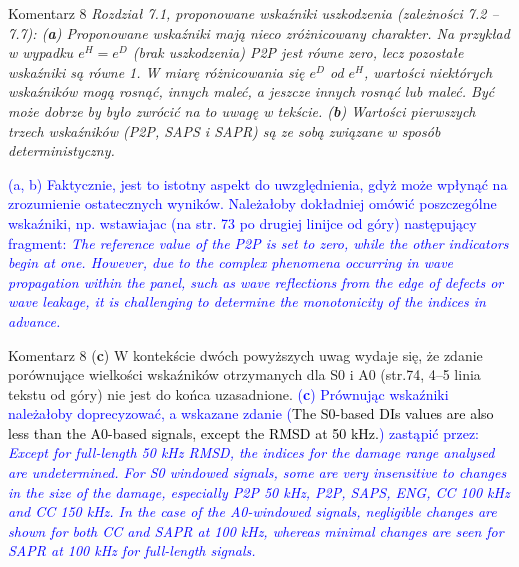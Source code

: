 \documentclass[10pt,aspectratio=169]{beamer} %
\begin{document}
\begin{frame}[label=frame13]{Komentarz 8}\justifying
\textit{Rozdział 7.1, proponowane wskaźniki uszkodzenia (zależności 7.2 – 7.7):
(\textbf{a}) Proponowane wskaźniki mają nieco zróżnicowany charakter. Na przykład w wypadku	\(e^H = e^D\) (brak uszkodzenia) P2P jest równe zero, lecz pozostałe wskaźniki są równe 1. W miarę różnicowania się \(e^D\) od \(e^H\), wartości niektórych wskaźników mogą rosnąć, innych maleć, a jeszcze innych rosnąć lub maleć. Być może dobrze by było zwrócić na to uwagę w tekście. (\textbf{b}) Wartości pierwszych trzech wskaźników (P2P, SAPS i SAPR) są ze sobą związane w sposób deterministyczny.\\}

\textcolor{blue}{(a, b) Faktycznie, jest to istotny aspekt do uwzględnienia, gdyż może wpłynąć na zrozumienie ostatecznych wyników. Należałoby dokładniej omówić poszczególne wskaźniki, np. wstawiajac (na str. 73 po drugiej linijce od góry) następujący fragment: \textit{The reference value of the P2P is set to zero, while the other indicators begin at one. However, due to the complex phenomena occurring in wave propagation within the panel, such as wave reflections from the edge of defects or wave leakage, it is challenging to determine the monotonicity of the indices in advance.}}
\end{frame}
\begin{frame}[label=frame14]{Komentarz 8}\justifying 
(\textbf{c}) W kontekście dwóch powyższych uwag wydaje się, że zdanie porównujące wielkości wskaźników otrzymanych dla S0 i A0 (str.74, 4–5 linia tekstu od góry) nie jest do końca uzasadnione.
\textcolor{blue}{(\textbf{c}) Prównując wskaźniki należałoby doprecyzować, a wskazane zdanie (\textcolor{black}{The S0-based DIs values are also less than the A0-based signals,	except the RMSD at 50 kHz.}) zastąpić przez: \textit{Except for full-length 50 kHz RMSD, the indices for the damage range analysed are undetermined. For S0 windowed signals, some are very insensitive to changes in the size of the damage, especially P2P 50 kHz, P2P, SAPS, ENG, CC 100 kHz and CC 150 kHz.
In the case of the A0-windowed signals, negligible changes are shown for both CC and SAPR at 100 kHz, whereas minimal changes are seen for SAPR at 100 kHz for full-length signals.}}
\end{frame}	
\end{document}
